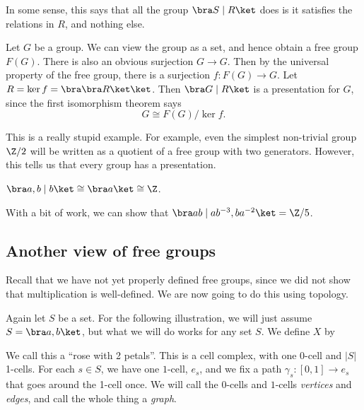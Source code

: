 \documentclass[a4paper]{article}
\begin{document}
In some sense, this says that all the group $\bra S\mid R \ket$ does is it satisfies the relations in $R$, and nothing else.

\begin{eg}
  Let $G$ be a group. We can view the group as a set, and hence obtain a free group $F(G)$. There is also an obvious surjection $G \to G$. Then by the universal property of the free group, there is a surjection $f: F(G) \to G$. Let $R = \ker f = \bra \bra R\ket \ket$. Then $\bra G \mid R \ket$ is a presentation for $G$, since the first isomorphism theorem says
  \[
    G \cong F(G) / \ker f.
  \]
\end{eg}
This is a really stupid example. For example, even the simplest non-trivial group $\Z/2$ will be written as a quotient of a free group with two generators. However, this tells us that every group has a presentation.

\begin{eg}
  $\bra a, b\mid b \ket \cong \bra a\ket \cong \Z$.
\end{eg}

\begin{eg}
  With a bit of work, we can show that $\bra a b\mid ab^{-3}, ba^{-2}\ket = \Z/5$.
\end{eg}

\subsection{Another view of free groups}
Recall that we have not yet properly defined free groups, since we did not show that multiplication is well-defined. We are now going to do this using topology.

Again let $S$ be a set. For the following illustration, we will just assume $S = \bra a, b\ket$, but what we will do works for any set $S$. We define $X$ by
\begin{center}
\end{center}
We call this a ``rose with 2 petals''. This is a cell complex, with one $0$-cell and $|S|$ 1-cells. For each $s \in S$, we have one $1$-cell, $e_s$, and we fix a path $\gamma_s: [0, 1] \to e_s$ that goes around the 1-cell once. We will call the $0$-cells and $1$-cells \emph{vertices} and \emph{edges}, and call the whole thing a \emph{graph}.
\end{document}

